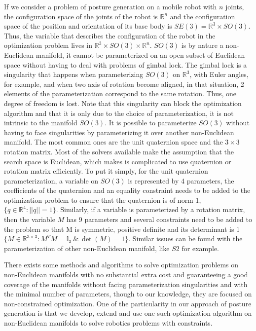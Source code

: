 If we consider a problem of posture generation on a mobile robot with $n$ joints, the configuration space of the joints of the robot is $\mathbb{R}^n$ and the configuration space of the position and orientation of its base body is $SE(3) = \mathbb{R}^3\times SO(3)$.
Thus, the variable that describes the configuration of the robot in the optimization problem lives in $\mathbb{R}^3\times SO(3) \times \mathbb{R}^n$.
$SO(3)$ is by nature a non-Euclidean manifold, it cannot be parameterized on an open subset of Euclidean space without having to deal with problems of gimbal lock.
The gimbal lock is a singularity that happens when parameterizing $SO(3)$ on $\mathbb{R}^3$, with Euler angles, for example, and when two axis of rotation become aligned, in that situation, 2 elements of the parameterization correspond to the same rotation.
Thus, one degree of freedom is lost.
Note that this singularity can block the optimization algorithm and that it is only due to the choice of parameterization, it is not intrinsic to the manifold $SO(3)$.
It is possible to parameterize $SO(3)$ without having to face singularities by parameterizing it over another non-Euclidean manifold.
The most common ones are the unit quaternion space and the $3\times 3$ rotation matrix.
Most of the solvers available make the assumption that the search space is Euclidean, which makes is complicated to use quaternion or rotation matrix efficiently.
To put it simply, for the unit quaternion parameterization, a variable on $SO(3)$ is represented by 4 parameters, the coefficients of the quaternion and an equality constraint needs to be added to the optimization problem to ensure that the quaternion is of norm 1, $\{q\in\mathbb{R}^4:||q||=1\}$.
Similarly, if a variable is parameterized by a rotation matrix, then the variable $M$ has 9 parameters and several constraints need to be added to the problem so that M is symmetric, positive definite and its determinant is 1 $\{M\in\mathbb{R}^{3\times 3}:M^T M = \mathbb{I}_3\  \&\ \det (M) = 1\}$.
Similar issues can be found with the parameterization of other non-Euclidean manifold, like $S2$ for example.

There exists some methods and algorithms to solve optimization problems on non-Euclidean manifolds with no substantial extra cost and guaranteeing a good coverage of the manifolds without facing parameterization singularities and with the minimal number of parameters, though to our knowledge, they are focused on non-constrained optimization.
One of the particularity in our approach of posture generation is that we develop, extend and use one such optimization algorithm on non-Euclidean manifolds to solve robotics problems with constraints.

